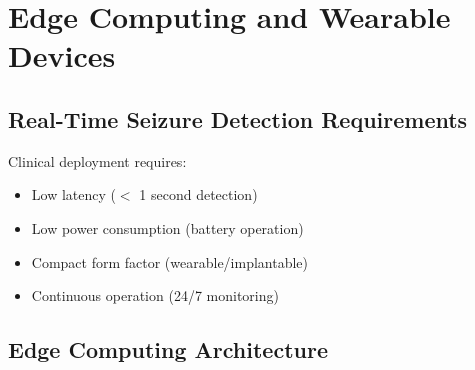 \documentclass[12pt,a4paper]{article}
\begin{document}
\section{Edge Computing and Wearable Devices}

\subsection{Real-Time Seizure Detection Requirements}

Clinical deployment requires:
\begin{itemize}
    \item Low latency ($<$ 1 second detection)
    \item Low power consumption (battery operation)
    \item Compact form factor (wearable/implantable)
    \item Continuous operation (24/7 monitoring)
\end{itemize}

\subsection{Edge Computing Architecture}
\end{document}
